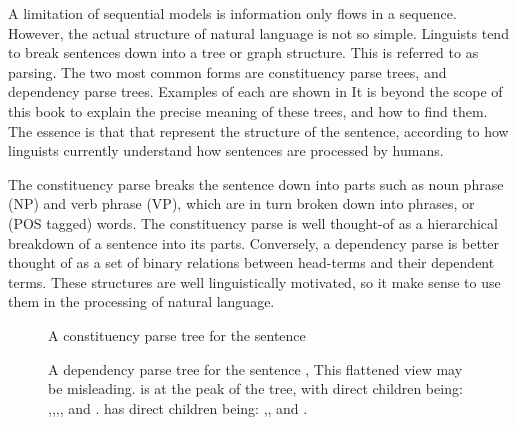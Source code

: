 \documentclass[12pt,parskip]{komatufte}
\begin{document}
A limitation of sequential models is information only flows in a sequence.
However, the actual structure of natural language is not so simple.
Linguists tend to break sentences down into a tree or graph structure.
This is referred to as parsing.
The two most common forms are constituency parse trees, and dependency parse trees.
Examples of each are shown in 
It is beyond the scope of this book to explain the precise meaning of these trees, and how to find them.
The essence is that that represent the structure of the sentence,
according to how linguists currently understand how sentences are processed by humans.

The constituency parse breaks the sentence down into parts such as noun phrase (NP) and verb phrase (VP),
which are in turn broken down into phrases, or (POS tagged) words.
The constituency parse is well thought-of as a hierarchical breakdown of a sentence into its parts.
Conversely, a dependency parse is better thought of as a set of binary relations between head-terms and their dependent terms.
These structures are well linguistically motivated, so it make sense to use them in the processing of natural language.

\begin{figure}
	\caption{A constituency parse tree for the sentence }
	\label{fig:consparse}
\end{figure}


\begin{figure}
	\caption{A dependency parse tree for the sentence ,
	This flattened view may be misleading.
	 is at the peak of the tree, with direct children	being:
	,,,,
	and .
	 has direct children being: ,, and .
	}
	\label{fig:depparse}
\end{figure}


\end{document}

